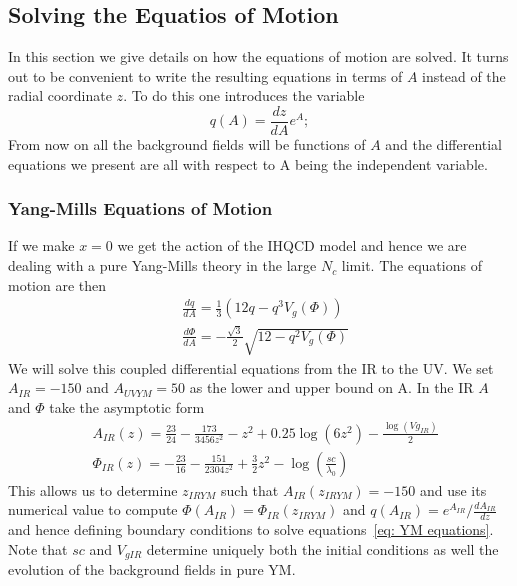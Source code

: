 \documentclass[10 pt]{article}
\begin{document}
\subsection{Solving the Equatios of Motion}

In this section we give details on how the equations of motion are solved. It turns out to be convenient to write the resulting equations in terms of $A$ instead of the radial coordinate $z$. To do this one introduces the variable
\begin{equation}
q\left(A\right) = \frac{dz}{dA} e^{A};
\label{eq: q definition}
\end{equation}
From now on all the background fields will be functions of $A$ and the differential equations we present are all with respect to A being the independent variable.

\subsubsection{Yang-Mills Equations of Motion}

If we make $x = 0$ we get the action of the IHQCD model and hence we are dealing with a pure Yang-Mills theory in the large $N_c$ limit. The equations of motion are then
\begin{align}
	&\frac{dq}{dA} = \frac{1}{3} \left( 12 q - q^3 V_g \left(\Phi\right) \right) \\
	&\frac{d\Phi}{dA} = - \frac{\sqrt{3}}{2} \sqrt{12 - q^2 V_g\left(\Phi\right)}
	\label{eq: YM equations}
\end{align}
We will solve this coupled differential equations from the IR to the UV. We set $A_{IR} = -150$ and $A_{UVYM} = 50$ as the lower and upper bound on A. In the IR $A$ and $\Phi$ take the asymptotic form
\begin{align}
&A_{IR} \left(z\right) = \frac{23}{24} - \frac{173}{3456 z^2} - z^2 + 0.25 \log(6 z^2) - \frac{\log(Vg_{IR})}{2} \\
&\Phi_{IR} \left(z \right) = - \frac{23}{16} - \frac{151}{2304 z^2} + \frac{3}{2} z^2 - \log(\frac{sc}{\lambda_0})
\label{eq: YM fields IR asymptotics}
\end{align}
This allows us to determine $z_{IRYM}$ such that $A_{IR}\left(z_{IRYM}\right) = -150$ and use its numerical value to compute $\Phi\left(A_{IR}\right) = \Phi_{IR} \left( z_{IRYM}\right)$ and $q\left(A_{IR}\right) = e^{A_{IR}} / \frac{dA_{IR}}{d z} $ and hence defining boundary conditions to solve equations~\ref{eq: YM equations}. Note that $sc$ and $V_{gIR}$ determine uniquely both the initial conditions as well the evolution of the background fields in pure YM.
\end{document}
